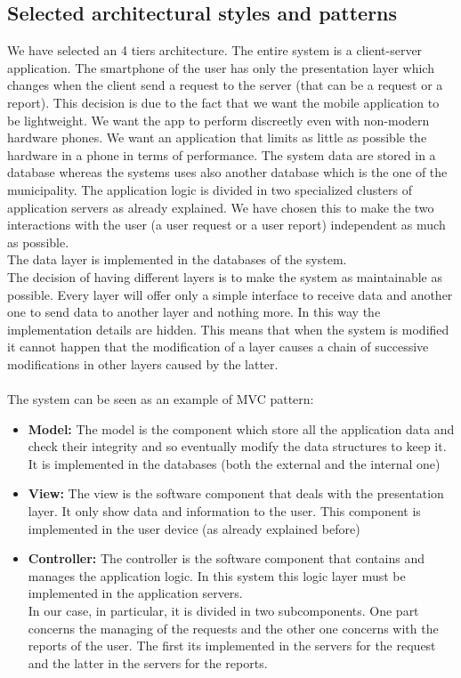 \documentclass[titlepage]{article}
\begin{document}
\subsection{Selected architectural styles and patterns}
We have selected an 4 tiers architecture. The entire system is a client-server application. The smartphone of the user has only the presentation layer which changes when the client send a request to the server (that can be a request or a report). This decision is due to the fact that we want the mobile application to be lightweight. We want the app to perform discreetly even with non-modern hardware phones. We want an application that limits as little as possible the hardware in a phone in terms of performance. The system data are stored in a database  whereas the systems uses also another database which is the one of the municipality.
The application logic is divided in two specialized clusters of application servers as already explained. We have chosen this to make the two interactions with the user (a user request or a user report) independent as much as possible.\\
 The data layer is implemented in the databases of the system.\\
The decision of having different layers is to make the system as maintainable as possible. Every layer will offer only a simple interface to receive data and another one to send data to another layer and nothing more. In this way the implementation details are hidden. This means that when the system is modified it cannot happen that the modification of a layer causes a chain of successive modifications in other layers caused by the latter.\\ \\
The system can be seen as an example of MVC pattern:
\begin{itemize}
	 \item \textbf{Model:} The model is the component which store all the application data and check their integrity and so eventually modify the data structures to keep it. It is implemented in the databases (both the external and the internal one)
	 \item \textbf{View:} The view is the software component that deals with the presentation layer. It only show data and information to the user. This component is implemented in the user device (as already explained before)
	 \item \textbf{Controller:} The controller is the software component that contains and manages the application logic. In this system this logic layer must be implemented in the application servers. \\
In our case, in particular, it is divided in two subcomponents. One part concerns the managing of the requests and the other one concerns with the reports of the user. The first its implemented in the servers for the request and the latter in the servers for the reports.
\end{itemize}
\end{document}
